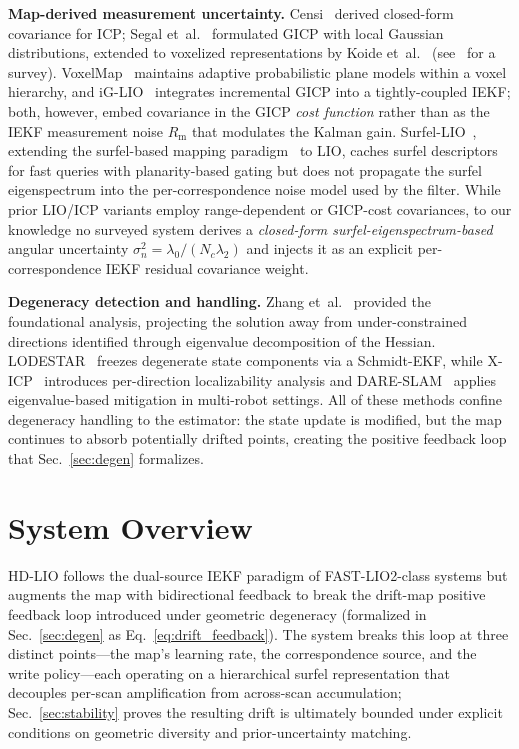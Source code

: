 \documentclass[conference]{IEEEtran}
\begin{document}
\textbf{Map-derived measurement uncertainty.}
Censi~\cite{censi2007accurate} derived closed-form covariance for ICP;
Segal et~al.~\cite{segal2009gicp} formulated GICP with local Gaussian
distributions, extended to voxelized representations by
Koide et~al.~\cite{koide2021vgicp} (see~\cite{pomerleau2015review} for
a survey). VoxelMap~\cite{yuan2022voxelmap} maintains adaptive
probabilistic plane models within a voxel hierarchy, and
iG-LIO~\cite{chen2024iglio} integrates incremental GICP into a
tightly-coupled IEKF; both, however, embed covariance in the GICP
\emph{cost function} rather than as the IEKF measurement noise
$R_\mathrm{m}$ that modulates the Kalman gain.
Surfel-LIO~\cite{lv2025surfellio}, extending the surfel-based mapping
paradigm~\cite{behley2018suma} to LIO, caches surfel descriptors for
fast queries with planarity-based gating but does not propagate the
surfel eigenspectrum into the per-correspondence noise model used by
the filter. While prior LIO/ICP variants employ range-dependent or
GICP-cost covariances, to our knowledge no surveyed system derives a
\emph{closed-form surfel-eigenspectrum-based} angular uncertainty
$\sigma^2_n{=}\lambda_0/(N_c\lambda_2)$ and injects it as an explicit
per-correspondence IEKF residual covariance weight.

\textbf{Degeneracy detection and handling.}
Zhang et~al.~\cite{zhang2016degeneracy} provided the foundational
analysis, projecting the solution away from under-constrained
directions identified through eigenvalue decomposition of the Hessian.
LODESTAR~\cite{li2025lodestar} freezes degenerate state components via
a Schmidt-EKF, while X-ICP~\cite{tuna2024xicp} introduces per-direction
localizability analysis and DARE-SLAM~\cite{ebadi2021dareslam} applies
eigenvalue-based mitigation in multi-robot settings.
All of these methods confine degeneracy handling to the estimator: the
state update is modified, but the map continues to absorb potentially
drifted points, creating the positive feedback loop that
Sec.~\ref{sec:degen} formalizes.

\section{System Overview}\label{sec:overview}

\noindent
HD-LIO follows the dual-source IEKF paradigm of FAST-LIO2-class
systems but augments the map with bidirectional feedback to break the
drift-map positive feedback loop introduced under geometric
degeneracy (formalized in Sec.~\ref{sec:degen} as
Eq.~\eqref{eq:drift_feedback}). The system breaks this loop at three
distinct points—the map's learning rate, the correspondence source,
and the write policy—each operating on a hierarchical surfel
representation that decouples per-scan amplification from across-scan
accumulation; Sec.~\ref{sec:stability} proves the resulting drift is
ultimately bounded under explicit conditions on geometric diversity
and prior-uncertainty matching.
\end{document}
